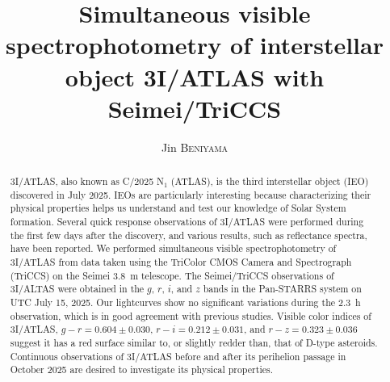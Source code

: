 \documentclass[]{pasj02}
\newcommand\gr{$g-r=0.604\pm0.030$\xspace}
\newcommand\ri{$r-i=0.212\pm0.031$\xspace}
\newcommand\rz{$r-z=0.323\pm0.036$\xspace}
\begin{document}
 

\title{Simultaneous visible spectrophotometry of interstellar object 3I/ATLAS with Seimei/TriCCS}

\author{
Jin \textsc{Beniyama}\altemailmark{}  
}


\maketitle

\begin{abstract}
3I/ATLAS, also known as C/2025 N$_1$ (ATLAS), is the third interstellar object (IEO) discovered in July 2025.
IEOs are particularly interesting because characterizing their physical properties helps us understand and test our knowledge of Solar System formation.
Several quick response observations of 3I/ATLAS were performed during the first few days after the discovery, and various results, such as reflectance spectra, have been reported.
We performed simultaneous visible spectrophotometry of 3I/ATLAS from data taken using the TriColor CMOS Camera and Spectrograph (TriCCS) on the Seimei 3.8~m telescope.
The Seimei/TriCCS observations of 3I/ALTAS were obtained in the $g$, $r$, $i$, and $z$ bands in the Pan-STARRS system on UTC July 15, 2025.
Our lightcurves show no significant variations during the 2.3~h observation, which is in good agreement with previous studies.
Visible color indices of 3I/ATLAS, \gr, \ri, and \rz suggest it has a red surface similar to, or slightly redder than, that of D-type asteroids.
Continuous observations of 3I/ATLAS before and after its perihelion passage in October 2025 are desired to investigate its physical properties.
\end{abstract}

\pagewiselinenumbers 
\clearpage
\end{document}
